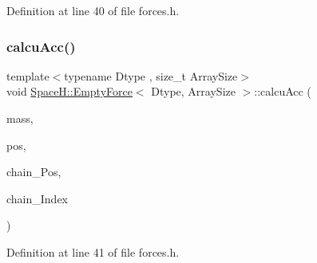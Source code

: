 Definition at line 40 of file forces.\+h.

\mbox{\label{struct_space_h_1_1_empty_force_aef0a45bc07150151ac18c6e180784e56}} 
\subsubsection{\texorpdfstring{calcu\+Acc()}{calcuAcc()}\hspace{0.1cm}{\footnotesize\ttfamily [3/4]}}
{\footnotesize\ttfamily template$<$typename Dtype , size\+\_\+t Array\+Size$>$ \\
void \mbox{\hyperlink{struct_space_h_1_1_empty_force}{Space\+H\+::\+Empty\+Force}}$<$ Dtype, Array\+Size $>$\+::calcu\+Acc (\begin{DoxyParamCaption}\item[{const \mbox{\hyperlink{struct_space_h_1_1_empty_force_afdeb66410650cdb1e2e3b1e1fd79540c}{Scalar\+Array}} \&}]{mass,  }\item[{const \mbox{\hyperlink{struct_space_h_1_1_empty_force_a06ad868879a6fa5def9c7f9fd75fffde}{Vector\+Array}} \&}]{pos,  }\item[{const \mbox{\hyperlink{struct_space_h_1_1_empty_force_a06ad868879a6fa5def9c7f9fd75fffde}{Vector\+Array}} \&}]{chain_\+Pos,  }\item[{const \mbox{\hyperlink{struct_space_h_1_1_empty_force_a25e0bd933dd3715e315c1abdb6843c36}{Index\+Array}} \&}]{chain_\+Index }\end{DoxyParamCaption})\hspace{0.3cm}{\ttfamily [inline]}}



Definition at line 41 of file forces.\+h.

\mbox{\label{struct_space_h_1_1_empty_force_a60c8642978737f561503d41d3dee90d7}} 
